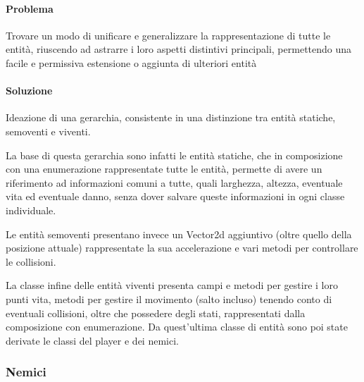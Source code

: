 \documentclass[a4paper,12pt]{report}
\begin{document}
    \paragraph{Problema} Trovare un modo di unificare e generalizzare la rappresentazione di tutte le entità, riuscendo ad astrarre i loro aspetti distintivi principali, permettendo una facile e permissiva estensione o aggiunta di ulteriori entità

    \paragraph{Soluzione} Ideazione di una gerarchia, consistente in una distinzione tra entità statiche, semoventi e viventi.

    La base di questa gerarchia sono infatti le entità statiche, che in composizione con una enumerazione rappresentate tutte le entità, permette di avere un riferimento ad informazioni comuni a tutte, quali larghezza, altezza, eventuale vita ed eventuale danno, senza dover salvare queste informazioni in ogni classe individuale.

    Le entità semoventi presentano invece un Vector2d aggiuntivo (oltre quello della posizione attuale) rappresentate la sua accelerazione e vari metodi per controllare le collisioni.

    La classe infine delle entità viventi presenta campi e metodi per gestire i loro punti vita, metodi per gestire il movimento (salto incluso)  tenendo conto di eventuali collisioni, oltre che possedere degli stati, rappresentati dalla composizione con enumerazione. Da quest’ultima classe di entità sono poi state derivate le classi del player e dei nemici.

    \subsubsection{Nemici}
\end{document}
